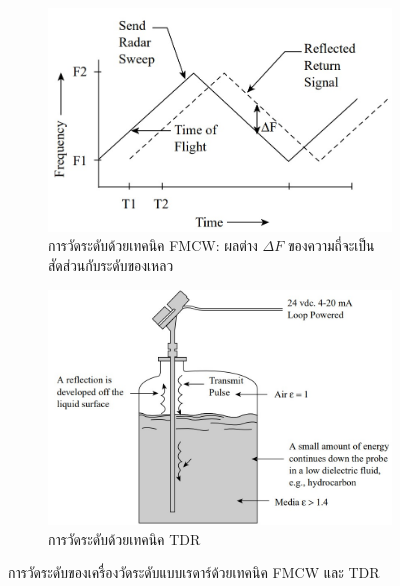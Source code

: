 \documentclass[final,11pt]{article}
\begin{document}
\begin{figure}
    \begin{subfigure}[b]{0.4\textwidth}
        \centering
        \includegraphics[width=\textwidth]{images/Screenshot_19.jpg}
        \caption{การวัดระดับด้วยเทคนิค FMCW: ผลต่าง $\Delta F$ ของความถี่จะเป็นสัดส่วนกับระดับของเหลว}
        \label{fig:rtl1}
    \end{subfigure}
    \hfill
    \begin{subfigure}[b]{0.6\textwidth}
        \centering
        \includegraphics[width=\textwidth]{images/Screenshot_18.jpg}
        \caption{การวัดระดับด้วยเทคนิค TDR}
        \label{fig:rtl2}
    \end{subfigure}
    \hfill
    \caption{การวัดระดับของเครื่องวัดระดับแบบเรดาร์ด้วยเทคนิค FMCW และ TDR}
    \label{fig:rtl}
\end{figure}
\end{document}
